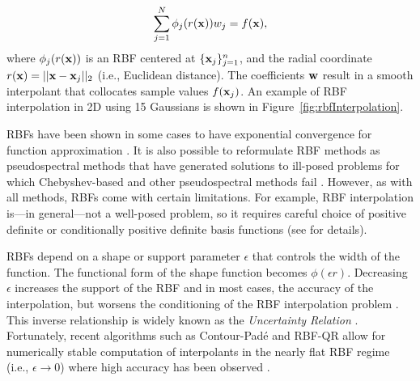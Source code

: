 \documentclass{report}
\begin{document}
{\begin{eqnarray*}
    \sum_{j=1}^{N} \phi_j(r(\mathbf{x})) w_{j}   = f(\mathbf{x}),
\end{eqnarray*}
where $\phi_j(r(\mathbf{x}))$ is an RBF centered at $\{\mathbf{x}_j\}_{j=1}^{n}$, and the radial coordinate $r(\mathbf{x}) = ||\mathbf{x}-\mathbf{x}_j||_2$ (i.e., Euclidean distance). The coefficients $\mathbf{w}$ result in a smooth interpolant that collocates sample values $f(\mathbf{x}_j)$. An example of RBF interpolation in 2D using 15 Gaussians is shown in Figure~\ref{fig:rbfInterpolation}.



RBFs have been shown in 
some cases to have exponential convergence for function approximation \cite{Fasshauer2007}. It is also possible to 
reformulate RBF methods as pseudospectral methods that have 
generated solutions to ill-posed problems for which Chebyshev-based and other pseudospectral methods 
fail \cite{Fasshauer2006}. However, as with all methods, RBFs come with certain limitations. For example, RBF interpolation is---in general---not a well-posed problem, so it requires careful choice of positive definite or conditionally positive definite basis functions (see \cite{Iske2004, Fasshauer2007} for details). 

RBFs depend on a shape or support parameter $\epsilon$ that controls the width of the function. The functional form of the shape function becomes $\phi(\epsilon r)$. Decreasing $\epsilon$ increases the support of the RBF and in most cases, the accuracy of the interpolation, but worsens the conditioning of the RBF interpolation problem \cite{Schaback1995}. This inverse relationship is widely known as the \emph{Uncertainty Relation} \cite{Schaback1995, Iske2004}. 
Fortunately, recent algorithms such as Contour-Pad\'{e} \cite{Fornberg2004} and RBF-QR \cite{Fornberg2007, Fornberg2011a} allow for numerically stable computation of interpolants in the nearly flat RBF regime (i.e., $\epsilon \rightarrow 0$) where high accuracy has been observed \cite{Larsson2003, Fornberg2008}. 










}
\end{document}
